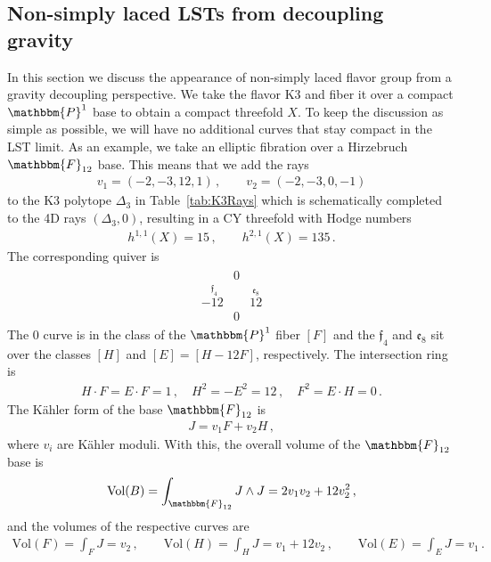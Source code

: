 \documentclass[11pt]{article}
\numberwithin{equation}{section}
\newcommand{\ff}{\mathfrak{f}}
\newcommand{\fe}{\mathfrak{e}}
\begin{document}
\subsection{Non-simply laced LSTs from decoupling gravity}
\label{ssec:gravdecouple}
In this section we discuss the appearance of non-simply laced flavor group from a gravity decoupling perspective. We take the flavor K3 and fiber it over a compact $\mathbbm{P}^1$ base to obtain a compact threefold $X$. To keep the discussion as simple as possible, we will have no additional curves that stay compact in the LST limit. As an example, we take an elliptic fibration over a Hirzebruch $\mathbbm{F}_{12}$ base. This means that we add the rays
\begin{align}
\label{eq:compactRays}
    v_1=(-2,-3,12,1) \, , \qquad v_2=(-2,-3,0,-1)
\end{align}
to the K3 polytope $\Delta_3$ in Table~\ref{tab:K3Rays} which is schematically completed to the 4D rays $(\Delta_3,0)$,
resulting in a CY threefold with Hodge numbers
\begin{align}
h^{1,1}(X)=15\,,\qquad h^{2,1}(X)=135\,.
\end{align}
The corresponding quiver is
\begin{align}
\begin{array}{ccc}
&0&\\
\overset{~~\ff_4}{-12}&&\overset{\fe_8}{12}\\
&0&
\end{array}
\end{align} 
The $0$ curve is in the class of the $\mathbbm{P}^1$ fiber $[F]$ and the $\ff_4$ and $\fe_8$ sit over the classes $[H]$ and $[E]=[H-12F]$, respectively. The intersection ring is
\begin{align}
    H \cdot F=E \cdot F=1\, , \quad  H^2=-E^2=12\, , \quad F^2=E \cdot H=0 \, .
\end{align}
The K\"ahler form of the base $\mathbbm{F}_{12}$ is
\begin{align}
    J=v_1 F+v_2 H\,,
\end{align}
where $v_i$ are K\"ahler moduli. With this, the overall volume of the $\mathbbm{F}_{12}$ base is
\begin{align}
    \text{Vol}(B)= \int_{\mathbbm{F}_{12}} J \wedge J = 2 v_1 v_2+12 v_2^2 \, ,
\end{align}
and the volumes of the respective curves are
\begin{align}
    \text{Vol}(F)= \int_F J= v_2 \, , \qquad
    \text{Vol}(H)= \int_H J=v_1 +12v_2 \, , \qquad
    \text{Vol}(E)= \int_E J= v_1 \,.
\end{align} 
\end{document}
